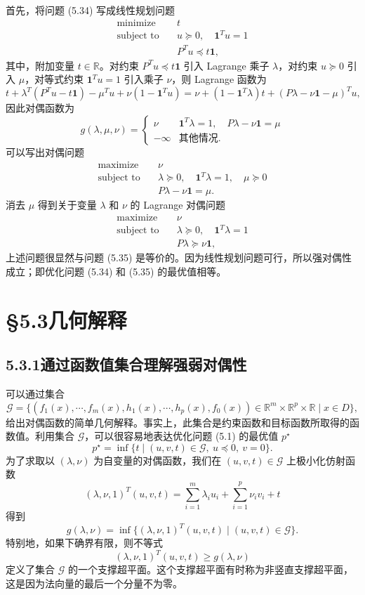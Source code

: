 \documentclass[UTF8,12pt,a4paper,fontset=fandol]{ctexart}
\begin{document}
首先，将问题 (5.34) 写成线性规划问题
\[
\begin{aligned}
\text{minimize}\quad & t\\
\text{subject to}\quad & u\succeq 0,\quad \mathbf{1}^Tu=1\\
& P^Tu\preceq t\mathbf{1},
\end{aligned}
\]
其中，附加变量 $t\in\mathbb{R}$。对约束 $P^Tu\preceq t\mathbf{1}$ 引入 Lagrange 乘子 $\lambda$，对约束 $u\succeq 0$ 引入 $\mu$，对等式约束 $\mathbf{1}^Tu=1$ 引入乘子 $\nu$，则 Lagrange 函数为
\[
t+\lambda^T(P^Tu-t\mathbf{1})-\mu^Tu+\nu(1-\mathbf{1}^Tu)
=\nu+(1-\mathbf{1}^T\lambda)t+(P\lambda-\nu\mathbf{1}-\mu)^Tu,
\]
因此对偶函数为
\[
g(\lambda,\mu,\nu)=
\begin{cases}
\nu & \mathbf{1}^T\lambda=1,\quad P\lambda-\nu\mathbf{1}=\mu\\
-\infty & \text{其他情况}.
\end{cases}
\]
可以写出对偶问题
\[
\begin{aligned}
\text{maximize}\quad & \nu\\
\text{subject to}\quad & \lambda\succeq 0,\quad \mathbf{1}^T\lambda=1,\quad \mu\succeq 0\\
& P\lambda-\nu\mathbf{1}=\mu.
\end{aligned}
\]
消去 $\mu$ 得到关于变量 $\lambda$ 和 $\nu$ 的 Lagrange 对偶问题
\[
\begin{aligned}
\text{maximize}\quad & \nu\\
\text{subject to}\quad & \lambda\succeq 0,\quad \mathbf{1}^T\lambda=1\\
& P\lambda\succeq \nu\mathbf{1},
\end{aligned}
\]
上述问题很显然与问题 (5.35) 是等价的。因为线性规划问题可行，所以强对偶性成立；即优化问题 (5.34) 和 (5.35) 的最优值相等。

\section*{§5.3\quad 几何解释}

\subsection*{5.3.1\quad 通过函数值集合理解强弱对偶性}

可以通过集合
\begin{equation}
\mathcal{G}=\{(f_1(x),\cdots,f_m(x),h_1(x),\cdots,h_p(x),f_0(x))\in\mathbb{R}^m\times\mathbb{R}^p\times\mathbb{R}\mid x\in D\},
\tag{5.36}
\end{equation}
给出对偶函数的简单几何解释。事实上，此集合是约束函数和目标函数所取得的函数值。利用集合 $\mathcal{G}$，可以很容易地表达优化问题 (5.1) 的最优值 $p^\star$
\[
p^\star=\inf\{t\mid (u,v,t)\in\mathcal{G},\ u\preceq 0,\ v=0\}.
\]
为了求取以 $(\lambda,\nu)$ 为自变量的对偶函数，我们在 $(u,v,t)\in\mathcal{G}$ 上极小化仿射函数
\[
(\lambda,\nu,1)^T(u,v,t)=\sum_{i=1}^m\lambda_i u_i+\sum_{i=1}^p\nu_i v_i+t
\]
得到
\[
g(\lambda,\nu)=\inf\{(\lambda,\nu,1)^T(u,v,t)\mid (u,v,t)\in\mathcal{G}\}.
\]
特别地，如果下确界有限，则不等式
\[
(\lambda,\nu,1)^T(u,v,t)\geq g(\lambda,\nu)
\]
定义了集合 $\mathcal{G}$ 的一个支撑超平面。这个支撑超平面有时称为非竖直支撑超平面，这是因为法向量的最后一个分量不为零。
\end{document}
